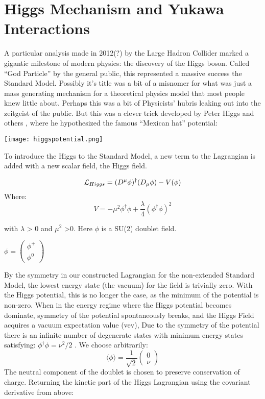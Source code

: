 \section{Higgs Mechanism and Yukawa Interactions}
\tab
A particular analysis made in 2012(?)  by the Large Hadron Collider  marked a gigantic milestone of modern physics: the discovery of the Higgs boson. Called “God Particle” by the general public, this represented a massive success the Standard Model. Possibly it’s title was a bit of a misnomer for what was just a mass generating mechanism for a theoretical physics model that most people knew little about. Perhaps this was a bit of Physicists’ hubris leaking out into the zeitgeist of the public. But this was a clever trick developed by Peter Higgs and others , where he hypothesized the famous “Mexican hat” potential:
\newline
\begin{center}
    \texttt{[image: higgspotential.png]}
\end{center}

To introduce the Higgs to the Standard Model, a new term to the Lagrangian is added with a new scalar field, the Higgs field. 

\begin{equation*}
    \mathcal{L}_{Higgs} = (D^{\mu}\phi)^{\dagger}(D_{\mu}\phi) - V(\phi)
\end{equation*}
Where:
\begin{equation*}
    V = - \mu^2 \phi^{\dagger}\phi + \frac{\lambda}{4}(\phi^{\dagger}\phi)^2
\end{equation*}

\begin{center}
with $\lambda$ > 0 and $\mu^2$ >0. Here $\phi$ is a SU(2) doublet field.
\end{center}
\begin{center}
    $\phi = 
    \begin{pmatrix}
    \phi^+\\
    \phi^0
    \end{pmatrix}$
\end{center}
\tab
By the symmetry in our constructed Lagrangian for the non-extended Standard Model, the lowest energy state (the vacuum) for the field is trivially zero. With the Higgs potential, this is no longer the case, as the minimum of the potential is non-zero. When in the energy regime where the Higgs potential becomes dominate, symmetry of the potential spontaneously breaks, and the Higgs Field acquires a vacuum expectation value (vev),   Due to the symmetry of the potential there is an infinite number of degenerate states with minimum energy states satisfying: $\phi^{\dagger}\phi = \nu^2/2$ . We choose arbitrarily:
\begin{equation*}
    \langle \phi \rangle = \frac{1}{\sqrt{2}}
    \begin{pmatrix}
    0\\
    \nu
    \end{pmatrix}
\end{equation*}
The neutral component of the doublet is chosen to preserve conservation of charge. Returning the kinetic part of the Higgs Lagrangian using the covariant derivative from above:

